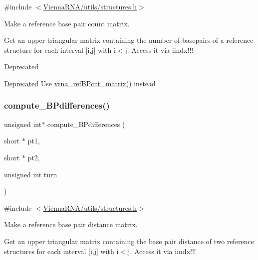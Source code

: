 {\ttfamily \#include $<$\mbox{\hyperlink{utils_2structures_8h}{Vienna\+R\+N\+A/utils/structures.\+h}}$>$}



Make a reference base pair count matrix. 

Get an upper triangular matrix containing the number of basepairs of a reference structure for each interval \mbox{[}i,j\mbox{]} with i$<$j. Access it via iindx!!!

\begin{DoxyRefDesc}{Deprecated}
\item[\mbox{\hyperlink{deprecated__deprecated000205}{Deprecated}}]Use \mbox{\hyperlink{group__struct__utils_gab4c2a00c99ce1d612ffa5bde114eb96d}{vrna\+\_\+ref\+B\+Pcnt\+\_\+matrix()}} instead\end{DoxyRefDesc}
\mbox{\label{group__struct__utils__deprecated_gadd463184355d0803b6ee6e09f29182f2}} 
\subsubsection{\texorpdfstring{compute\_BPdifferences()}{compute\_BPdifferences()}}
{\footnotesize\ttfamily unsigned int$\ast$ compute\+\_\+\+B\+Pdifferences (\begin{DoxyParamCaption}\item[{short $\ast$}]{pt1,  }\item[{short $\ast$}]{pt2,  }\item[{unsigned int}]{turn }\end{DoxyParamCaption})}



{\ttfamily \#include $<$\mbox{\hyperlink{utils_2structures_8h}{Vienna\+R\+N\+A/utils/structures.\+h}}$>$}



Make a reference base pair distance matrix. 

Get an upper triangular matrix containing the base pair distance of two reference structures for each interval \mbox{[}i,j\mbox{]} with i$<$j. Access it via iindx!!!

